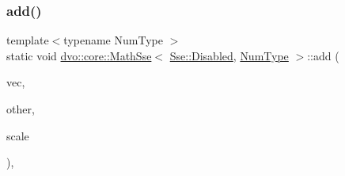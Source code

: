 \subsubsection{\texorpdfstring{add()}{add()}}
{\footnotesize\ttfamily template$<$typename Num\+Type $>$ \\
static void \mbox{\hyperlink{classdvo_1_1core_1_1_math_sse}{dvo\+::core\+::\+Math\+Sse}}$<$ \mbox{\hyperlink{structdvo_1_1core_1_1_sse_a4fd9b55a1ec035f837cc78f33d45a9adaeeb0a9210cb89d05bec4d9b12e628ae3}{Sse\+::\+Disabled}}, \mbox{\hyperlink{namespacedvo_1_1core_ab9c199d221775a923e2549ad7e15c323}{Num\+Type}} $>$\+::add (\begin{DoxyParamCaption}\item[{Eigen\+::\+Matrix$<$ \mbox{\hyperlink{namespacedvo_1_1core_ab9c199d221775a923e2549ad7e15c323}{Num\+Type}}, 6, 1 $>$ \&}]{vec,  }\item[{const Eigen\+::\+Matrix$<$ \mbox{\hyperlink{namespacedvo_1_1core_ab9c199d221775a923e2549ad7e15c323}{Num\+Type}}, 6, 1 $>$ \&}]{other,  }\item[{const \mbox{\hyperlink{namespacedvo_1_1core_ab9c199d221775a923e2549ad7e15c323}{Num\+Type}} \&}]{scale }\end{DoxyParamCaption})\hspace{0.3cm}{\ttfamily [inline]}, {\ttfamily [static]}}

\mbox{\label{classdvo_1_1core_1_1_math_sse_3_01_sse_1_1_disabled_00_01_num_type_01_4_ad8e43368f340963344f0d87a1a72e070}} 
